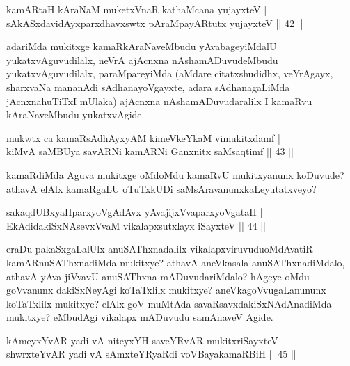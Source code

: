 \begin{shl}
kamARtaH kAraNaM muketxVnaR kathaMcana yujayxteV |\\
sAkASxdavidAyxparxdhavxswtx pAraMpayARtutx yujayxteV \hfill || 42 ||
\end{shl}

\begin{artha}
adariMda mukitxge kamaRkAraNaveMbudu yAvabageyiMdalU yukatxvAguvudilalx, neVrA ajAcnxna nAshamADuvudeMbudu yukatxvAguvudilalx, paraMpareyiMda (aMdare citatxshudidhx, veYrAgayx, sharxvaNa mananAdi sAdhanayoVgayxte, adara sAdhanagaLiMda jAcnxnahuTiTxI mUlaka) ajAcnxna nAshamADuvudaralilx I kamaRvu kAraNaveMbudu yukatxvAgide.
\end{artha}


\begin{shl}
mukwtx ca kamaRsAdhAyxyAM kimeVkeYkaM vimukitxdamf |\\
kiMvA saMBUya savARNi kamARNi Ganxnitx saMsaqtimf \hfill || 43 ||
\end{shl}

\begin{artha}
kamaRdiMda Aguva mukitxge oMdoMdu kamaRvU mukitxyanunx koDuvude? athavA elAlx kamaRgaLU oTuTxkUDi saMsAravanunx\break kaLeyutatxveyo?
\end{artha}

\begin{shl}
sakaqdUBxyaHparxyoVgAdAvx yAvajijxVvaparxyoVgataH |\\
EkAdidakiSxNAsevxVvaM vikalapxsutxlayx iSayxteV \hfill || 44 ||
\end{shl}

\begin{artha}
eraDu pakaSxgaLalUlx anuSAThxnadalilx vikalapxviruvudu\mdash\break oMdAvatiR kamARnuSAThxnadiMda mukitxye? athavA aneVkasala anuSAThxnadiMdalo, athavA yAva jiVvavU anuSAThxna mADuvudariMdalo? hAgeye oMdu goVvanunx dakiSxNeyAgi koTaTxlilx mukitxye? aneVkagoVvugaLanununx  koTaTxlilx mukitxye? elAlx goV muMtAda savaRsavxdakiSxNAdAnadiMda mukitxye? eMbudAgi vikalapx mADuvudu samAnaveV Agide.
\end{artha}

\begin{shl}
kAmeyxYvAR yadi vA niteyxYH saveYRvAR mukitxriSayxteV |\\
shwrxteYvAR yadi vA sAmxteYRyaRdi voVBayakamaRBiH \hfill || 45 ||
\end{shl}

